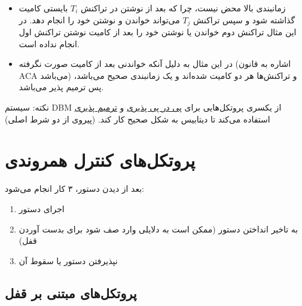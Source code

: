 \documentclass[a4paper]{article}
\begin{document}
\begin{LTR}
    \begin{table}[h]
        \centering
        \begin{RTL}
            \caption{مثال ۵: بررسی تمام لایه‌های ترمیم پذیری}
        \end{RTL}
    \end{table}
\end{LTR}

\begin{itemize}
    \item زمانبندی بالا محض نیست، چرا که بعد از نوشتن در تراکنش $T_i$ بایستی
    کامیت گذاشته شود و سپس تراکنش $T_j$ می‌تواند خواندن و نوشتن خود را انجام
    دهد. در این مثال تراکنش دوم خواندن یا نوشتن خود را بعد از کامیت نوشتن تراکنش
    اول انجام نداده است.
    \item در این مثال به دلیل آنکه خواندنی بعد از کامیت صورت نگرفته (اشاره به
    قانون ACA می‌باشد) و تراکنش‌ها هر دو کامیت شده‌اند و یک زمانبندی صحیح
    می‌باشد، پس ترمیم پذیر می‌باشد.
\end{itemize}

نکته: سیستم DBM از یکسری پروتکل‌هایی برای \underline{پی در پی پذیری} و
\underline{ترمیم پذیری} استفاده می‌کند تا دیتابیس به شکل صحیح کار کند. (پیروی از
دو شرط اصلی)

\section{پروتکل‌های کنترل همروندی}

بعد از دیدن دستور، ۳ کار انجام می‌شود:

\begin{enumerate}
    \item اجرای دستور
    \item به تاخیر انداختن دستور (ممکن است به دلایلی وارد صف شود برای بدست آوردن
    قفل)
    \item نپذیرفتن دستور یا سقوط آن
\end{enumerate}

\subsection{پروتکل‌های مبتنی بر قفل}
\end{document}
